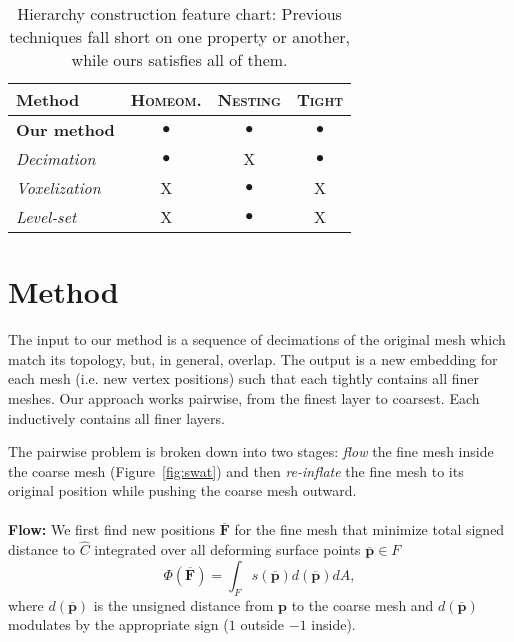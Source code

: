 \documentclass{cgyrf15}
\newcommand{\ra}[1]{\renewcommand{\arraystretch}{#1}}
\newcommand{\NO}{{\color{red}\textsf{X}}}
\newcommand{\YES}{$\bullet$}
\begin{document}
\begin{table}
\centering
\ra{1.2}
\setlength{\tabcolsep}{5.5pt}
\begin{tabularx}{\linewidth}{X c c c}
\rowcolor{white}
\toprule
Method               & \textsc{Homeom.} & \textsc{Nesting}& \textsc{Tight} \\
\midrule                                                                       
\textbf{Our method}  & \YES                  & \YES            & \YES           \\
\emph{Decimation}                                                               
                     & \YES                  & \NO             & \YES           \\
\emph{Voxelization}                                                             
                     & \NO                   & \YES            & \NO            \\
\emph{Level-set}                                                                
                     & \NO                   & \YES            & \NO            \\
\bottomrule
\end{tabularx}
\caption{Hierarchy construction feature chart: Previous techniques fall short
on one property or another, while ours satisfies all of them.}
\label{tab:feature-chart}
\end{table}

\section{Method}

The input to our method is a sequence of decimations of the original mesh which match its topology, but, in general, overlap. The output is a new embedding for each mesh (i.e. new vertex positions) such that each tightly contains all finer meshes. Our approach works pairwise, from the finest layer to coarsest. Each inductively contains all finer layers.

The pairwise problem is broken down into two stages: \emph{flow} the fine mesh inside the coarse mesh  (Figure~\ref{fig:swat}) and then \emph{re-inflate} the fine mesh to its original position while pushing the coarse mesh outward.\\
\\
\textbf{Flow:} We first find new positions $\overline{\mathbf{F}}$ for the fine
mesh that minimize total signed distance to $\hat{C}$ integrated over all
deforming surface points $\overline{\textbf{p}} \in F$
\begin{equation}
\Phi(\overline{\mathbf{F}}) = \int_F s(\overline{\mathbf{p}}) d(\overline{\mathbf{p}}) dA,
\label{eq:flow_energy}
\end{equation}
where $d(\overline{\mathbf{p}})$ is the unsigned distance from $\mathbf{p}$ to the 
coarse mesh and $d(\overline{\mathbf{p}})$ modulates by the appropriate sign
($1$ outside $-1$ inside).
\end{document}
